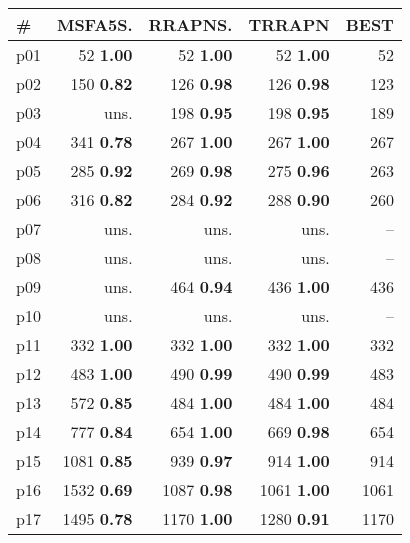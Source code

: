 \begin{tabular}{|l|rrr|r|}
\hline
\textbf{\#} & \textbf{MSFA5S.} & \textbf{RRAPNS.} & \textbf{TRRAPN} & \textbf{BEST}\\
\hline
p01 & {\footnotesize 52} \textbf{1.00} & {\footnotesize 52} \textbf{1.00} & {\footnotesize 52} \textbf{1.00} & 52\\
p02 & {\footnotesize 150} \textbf{0.82} & {\footnotesize 126} \textbf{0.98} & {\footnotesize 126} \textbf{0.98} & 123\\
p03 & uns. & {\footnotesize 198} \textbf{0.95} & {\footnotesize 198} \textbf{0.95} & 189\\
p04 & {\footnotesize 341} \textbf{0.78} & {\footnotesize 267} \textbf{1.00} & {\footnotesize 267} \textbf{1.00} & 267\\
p05 & {\footnotesize 285} \textbf{0.92} & {\footnotesize 269} \textbf{0.98} & {\footnotesize 275} \textbf{0.96} & 263\\
p06 & {\footnotesize 316} \textbf{0.82} & {\footnotesize 284} \textbf{0.92} & {\footnotesize 288} \textbf{0.90} & 260\\
p07 & uns. & uns. & uns. & --\\
p08 & uns. & uns. & uns. & --\\
p09 & uns. & {\footnotesize 464} \textbf{0.94} & {\footnotesize 436} \textbf{1.00} & 436\\
p10 & uns. & uns. & uns. & --\\
p11 & {\footnotesize 332} \textbf{1.00} & {\footnotesize 332} \textbf{1.00} & {\footnotesize 332} \textbf{1.00} & 332\\
p12 & {\footnotesize 483} \textbf{1.00} & {\footnotesize 490} \textbf{0.99} & {\footnotesize 490} \textbf{0.99} & 483\\
p13 & {\footnotesize 572} \textbf{0.85} & {\footnotesize 484} \textbf{1.00} & {\footnotesize 484} \textbf{1.00} & 484\\
p14 & {\footnotesize 777} \textbf{0.84} & {\footnotesize 654} \textbf{1.00} & {\footnotesize 669} \textbf{0.98} & 654\\
p15 & {\footnotesize 1081} \textbf{0.85} & {\footnotesize 939} \textbf{0.97} & {\footnotesize 914} \textbf{1.00} & 914\\
p16 & {\footnotesize 1532} \textbf{0.69} & {\footnotesize 1087} \textbf{0.98} & {\footnotesize 1061} \textbf{1.00} & 1061\\
p17 & {\footnotesize 1495} \textbf{0.78} & {\footnotesize 1170} \textbf{1.00} & {\footnotesize 1280} \textbf{0.91} & 1170\\

\end{tabular}
